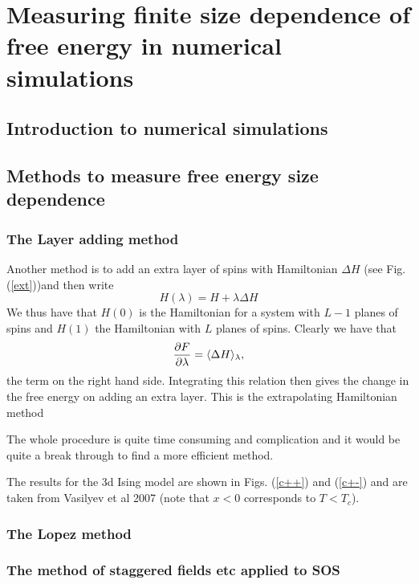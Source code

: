 
\chapter{Measuring finite size dependence of free energy in numerical simulations}
\section{Introduction to numerical simulations}

\section{Methods to measure free energy size dependence}
\subsection{The Layer adding method}
Another method is to add an extra layer of spins with Hamiltonian $\Delta H$ (see Fig. (\ref{ext}))and then write
\begin{equation}
H(\lambda) = H +\lambda \Delta H
\end{equation}
We thus have that $H(0)$ is the Hamiltonian for a system with $L-1$ planes of spins and 
$H(1)$ the Hamiltonian with $L$ planes of spins. Clearly we have that
\begin{equation}
{\partial F\over \partial \lambda} = \langle \Delta H \rangle_\lambda,
\end{equation}
the term on the right hand side. Integrating this relation then gives the change in the free energy on adding an extra layer. This is the extrapolating Hamiltonian method

The whole procedure is quite time consuming and complication and it would be quite a break through to find a more efficient method. 

The results for the 3d Ising model are shown in Figs. (\ref{c++}) and (\ref{c+-}) and are taken from Vasilyev et al 2007 (note that $x<0$ corresponds to $T<T_c$).

%
\subsection{The Lopez method}
\subsection{The method of staggered fields etc applied to SOS}
